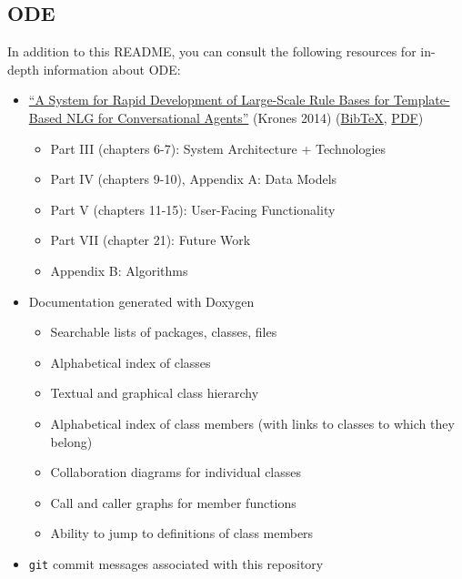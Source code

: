 \documentclass[11pt]{article}
\begin{document}
\subsection{ODE}
\label{sec-4-4}
In addition to this README, you can consult the following resources
for in-depth information about ODE:

\begin{itemize}
\item \href{http://www.dfki.de/lt/publication_show.php?id=7689}{``A System for Rapid Development of Large-Scale Rule Bases for Template-Based NLG for Conversational Agents''} (Krones 2014) (\href{http://www.dfki.de/lt/bibtex.php?id=7689}{BibTeX}, \href{http://www.dfki.de/web/forschung/iwi/publikationen/renameFileForDownload?filename=thesis-krones-final.pdf&file_id=uploads_2404}{PDF})
\begin{itemize}
\item Part III (chapters 6-7): System Architecture + Technologies
\item Part IV (chapters 9-10), Appendix A: Data Models
\item Part V (chapters 11-15): User-Facing Functionality
\item Part VII (chapter 21): Future Work
\item Appendix B: Algorithms
\end{itemize}
\item Documentation generated with Doxygen
\begin{itemize}
\item Searchable lists of packages, classes, files
\item Alphabetical index of classes
\item Textual and graphical class hierarchy
\item Alphabetical index of class members (with links to classes to
which they belong)
\item Collaboration diagrams for individual classes
\item Call and caller graphs for member functions
\item Ability to jump to definitions of class members
\end{itemize}
\item \texttt{git} commit messages associated with this repository
\end{itemize}
\end{document}
